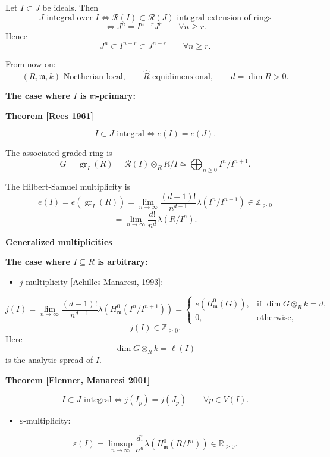 Let $I\subset J$ be ideals. Then
$$
J\text{ integral over }I
\Longleftrightarrow
\mathcal{R}(I)\subset\mathcal{R}(J)
\text{ integral extension of rings}
$$
$$
\Longleftrightarrow
J^n=I^{n-r}J^r
\qquad
\forall n\geq r.
$$
Hence
$$
J^n\subset I^{n-r}\subset J^{n-r}
\qquad
\forall n\geq r.
$$

From now on:
$$
(R,\mathfrak{m},k)
\text{ Noetherian local},\qquad
\widehat{R}\text{ equidimensional},
\qquad
d=\dim R>0.
$$

\medskip\noindent
{\bf The case where $I$ is
$\mathfrak{m}$-primary:}

\medskip\noindent
{\bf Theorem [Rees 1961]}

$$
I\subset J\text{ integral}
\Longleftrightarrow
e(I)=e(J).
$$

The associated graded ring is
$$
G
=
\operatorname{gr}_I(R)
=
\mathcal{R}(I)\otimes_R R/I
\simeq
\bigoplus_{n\geq 0}I^n/I^{n+1}.
$$

The Hilbert-Samuel multiplicity is
$$
e(I)
=
e(\operatorname{gr}_I(R))
=
\lim_{n\to\infty}
\frac{(d-1)!}{n^{d-1}}
\lambda(I^n/I^{n+1})
\in\mathbb{Z}_{>0}
$$
$$
=
\lim_{n\to\infty}
\frac{d!}{n^d}\lambda(R/I^n).
$$

\medskip\noindent
{\bf Generalized multiplicities}

\medskip\noindent
{\bf The case where $I\subseteq R$ is
arbitrary:}

\begin{itemize}
\item
$j$-multiplicity
[Achilles-Manaresi, 1993]:
\end{itemize}
$$
j(I)
=
\lim_{n\to\infty}
\frac{(d-1)!}{n^
{d-1}}
\lambda\left(
H_{\mathfrak{m}}^0(I^n/I^{n+1})
\right)
=
\begin{cases}
e\left(H_{\mathfrak{m}}^0(G)\right),
&
\text{if }\dim G\otimes_R k=d,
\\
0,
&
\text{otherwise},
\end{cases}
$$
$$
j(I)\in\mathbb{Z}_{\geq 0}.
$$
Here
$$
\dim G\otimes_R k=\ell(I)
$$
is the analytic spread of $I$.

\medskip\noindent
{\bf Theorem [Flenner, Manaresi 2001]}

$$
I\subset J\text{ integral}
\Longleftrightarrow
j(I_p)=j(J_p)
\qquad
\forall p\in V(I).
$$

\begin{itemize}
\item
$\varepsilon$-multiplicity:
\end{itemize}
$$
\varepsilon(I)
=
\limsup_{n\to\infty}
\frac{d!}{n^d}
\lambda\left(
H_{\mathfrak{m}}^0(R/I^n)
\right)
\in\mathbb{R}_{\geq 0}.
$$

